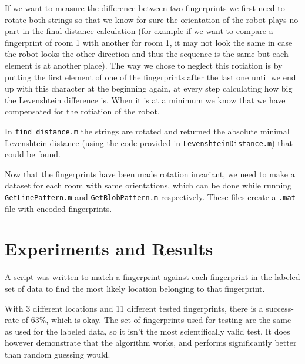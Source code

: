 \documentclass[a4paper, 20pt]{article}
\begin{document}
If we want to measure the difference between two fingerprints we first need to
rotate both strings so that we know for sure the orientation of the robot plays
no part in the final distance calculation (for example if we want to compare a
fingerprint of room 1 with another for room 1, it may not look the same in case
the robot looks the other direction and thus the sequence is the same but each
element is at another place). The way we chose to neglect this rotiation is by
putting the first element of one of the fingerprints after the last one until we
end up with this character at the beginning again, at every step calculating how
big the Levenshtein difference is. When it is at a minimum we know that we have
compensated for the rotiation of the robot.

In \texttt{find\_distance.m} the strings are rotated and returned the absolute minimal
Levenshtein distance (using the code provided in \texttt{LevenshteinDistance.m}) that could be found.

Now that the fingerprints have been made rotation invariant, we need to make a
dataset for each room with same orientations, which can be done while running
\texttt{GetLinePattern.m} and \texttt{GetBlobPattern.m} respectively. These
files create a \texttt{.mat} file with encoded fingerprints.



\section{Experiments and Results}
A script was written to match a fingerprint against each fingerprint in the
labeled set of data to find the most likely location belonging to that
fingerprint.

With 3 different locations and 11 different tested fingerprints, there is a
success-rate of 63\%, which is okay. The set of fingerprints used for testing
are the same as used for the labeled data, so it isn't the most scientifically
valid test. It does however demonstrate that the algorithm works, and
performs significantly better than random guessing would.
\end{document}
